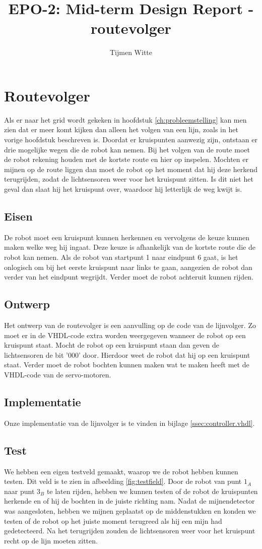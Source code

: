 \documentclass{report}
\title{EPO-2: Mid-term Design Report - routevolger}
\author{Tijmen Witte}
\begin{document}
\chapter{Routevolger}
\label{ch:routevolger}

Als er naar het grid wordt gekeken in hoofdstuk \ref{ch:probleemstelling} kan men zien dat er meer komt kijken dan alleen het volgen van een lijn, zoals in het vorige hoofdstuk beschreven is.
Doordat er kruispunten aanwezig zijn, ontstaan er drie mogelijke wegen die de robot kan nemen.
Bij het volgen van de route moet de robot rekening houden met de kortste route en hier op inspelen.
Mochten er mijnen op de route liggen dan moet de robot op het moment dat hij deze herkend terugrijden, zodat de lichtsensoren weer voor het kruispunt zitten.
Is dit niet het geval dan slaat hij het kruispunt over, waardoor hij letterlijk de weg kwijt is.

\section{Eisen}
De robot moet een kruispunt kunnen herkennen en vervolgens de keuze kunnen maken welke weg hij ingaat.
Deze keuze is afhankelijk van de kortste route die de robot kan nemen.
Als de robot van startpunt 1 naar eindpunt 6 gaat, is het onlogisch om bij het eerste kruispunt naar links te gaan, aangezien de robot dan verder van het eindpunt wegrijdt.
Verder moet de robot achteruit kunnen rijden.

\section{Ontwerp}
Het ontwerp van de routevolger is een aanvulling op de code van de lijnvolger.
Zo moet er in de VHDL-code extra worden weergegeven wanneer de robot op een kruispunt staat.
Mocht de robot op een kruispunt staan dan geven de lichtsensoren de bit '000' door. Hierdoor weet de robot dat hij op een kruispunt staat.
Verder moet de robot bochten kunnen maken wat te maken heeft met de VHDL-code van de servo-motoren.

\section{Implementatie}
Onze implementatie van de lijnvolger is te vinden in bijlage \ref{ssec:controller.vhdl}.

\section{Test}
We hebben een eigen testveld gemaakt, waarop we de robot hebben kunnen testen.
Dit veld is te zien in afbeelding \ref{fig:testfield}.
Door de robot van punt $1_A$ naar punt $3_B$ te laten rijden, hebben we kunnen testen of de robot de kruispunten herkende en of hij de bochten in de juiste richting nam.
Nadat de mijnendetector was aangesloten, hebben we mijnen geplaatst op de middenstukken en konden we testen of de robot op het juiste moment terugreed als hij een mijn had gedetecteerd. Na het terugrijden zouden de lichtsensoren weer voor het kruispunt recht op de lijn moeten zitten.
\end{document}
